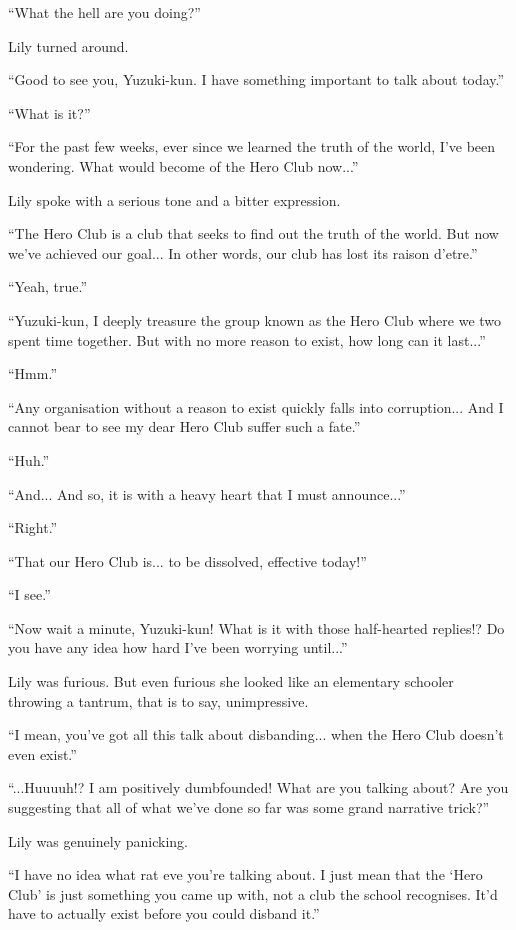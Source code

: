 ``What the hell are you doing?''

Lily turned around.

``Good to see you, Yuzuki-kun. I have something important to talk about today.''

``What is it?''

``For the past few weeks, ever since we learned the truth of the world, I've been wondering. What would become of the Hero Club now...''

Lily spoke with a serious tone and a bitter expression.

``The Hero Club is a club that seeks to find out the truth of the world. But now we've achieved our goal... In other words, our club has lost its raison d'etre.''

``Yeah, true.''

``Yuzuki-kun, I deeply treasure the group known as the Hero Club where we two spent time together. But with no more reason to exist, how long can it last...''

``Hmm.''

``Any organisation without a reason to exist quickly falls into corruption... And I cannot bear to see my dear Hero Club suffer such a fate.''

``Huh.''

``And... And so, it is with a heavy heart that I must announce...''

``Right.''

``That our Hero Club is... to be dissolved, effective today!''

``I see.''

``Now wait a minute, Yuzuki-kun! What is it with those half-hearted replies!? Do you have any idea how hard I've been worrying until...''

Lily was furious. But even furious she looked like an elementary schooler throwing a tantrum, that is to say, unimpressive.

``I mean, you've got all this talk about disbanding... when the Hero Club doesn't even exist.''

``...Huuuuh!? I am positively dumbfounded! What are you talking about? Are you suggesting that all of what we've done so far was some grand narrative trick?''

Lily was genuinely panicking.

``I have no idea what rat eve you're talking about. I just mean that the `Hero Club' is just something you came up with, not a club the school recognises. It'd have to actually exist before you could disband it.''

